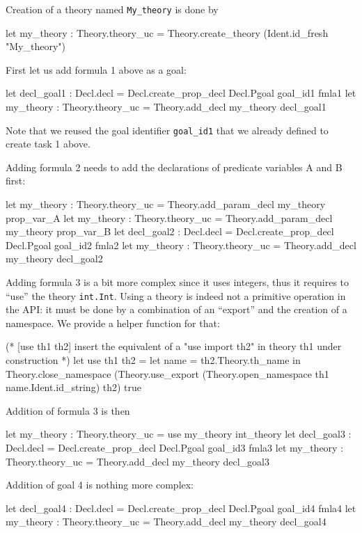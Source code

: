 Creation of a theory named \verb|My_theory| is done by
\begin{ocamlcode}
let my_theory : Theory.theory_uc =
  Theory.create_theory (Ident.id_fresh "My_theory")
\end{ocamlcode}

First let us add formula 1 above as a goal:
\begin{ocamlcode}
let decl_goal1 : Decl.decl =
  Decl.create_prop_decl Decl.Pgoal goal_id1 fmla1
let my_theory : Theory.theory_uc =
  Theory.add_decl my_theory decl_goal1
\end{ocamlcode}
Note that we reused the goal identifier \verb|goal_id1| that we
already defined to create task 1 above.

Adding formula 2 needs to add the declarations of predicate variables A
and B first:
\begin{ocamlcode}
let my_theory : Theory.theory_uc =
  Theory.add_param_decl my_theory prop_var_A
let my_theory : Theory.theory_uc =
  Theory.add_param_decl my_theory prop_var_B
let decl_goal2 : Decl.decl =
  Decl.create_prop_decl Decl.Pgoal goal_id2 fmla2
let my_theory : Theory.theory_uc = Theory.add_decl my_theory decl_goal2
\end{ocamlcode}

Adding formula 3 is a bit more complex since it uses integers, thus it
requires to ``use'' the theory \verb|int.Int|. Using a theory is
indeed not a primitive operation in the API: it must be done by a
combination of an ``export'' and the creation of a namespace. We
provide a helper function for that:
\begin{ocamlcode}
(* [use th1 th2] insert the equivalent of a "use import th2" in
  theory th1 under construction *)
let use th1 th2 =
  let name = th2.Theory.th_name in
  Theory.close_namespace
    (Theory.use_export
      (Theory.open_namespace th1 name.Ident.id_string) th2) true
\end{ocamlcode}
Addition of formula 3 is then
\begin{ocamlcode}
let my_theory : Theory.theory_uc = use my_theory int_theory
let decl_goal3 : Decl.decl =
  Decl.create_prop_decl Decl.Pgoal goal_id3 fmla3
let my_theory : Theory.theory_uc =
  Theory.add_decl my_theory decl_goal3
\end{ocamlcode}

Addition of goal 4 is nothing more complex:
\begin{ocamlcode}
let decl_goal4 : Decl.decl =
  Decl.create_prop_decl Decl.Pgoal goal_id4 fmla4
let my_theory :
  Theory.theory_uc = Theory.add_decl my_theory decl_goal4
\end{ocamlcode}

